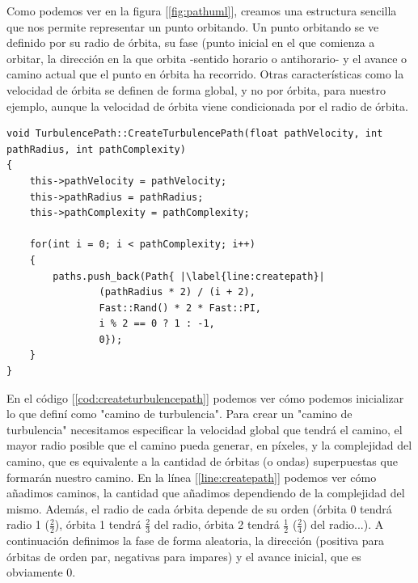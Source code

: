 Como podemos ver en la figura [\ref{fig:pathuml}], creamos una estructura sencilla que nos permite representar un punto orbitando. Un punto orbitando se ve definido por su radio de órbita, su fase (punto inicial en el que comienza a orbitar, la dirección en la que orbita -sentido horario o antihorario- y el avance o camino actual que el punto en órbita ha recorrido. Otras características como la velocidad de órbita se definen de forma global, y no por órbita, para nuestro ejemplo, aunque la velocidad de órbita viene condicionada por el radio de órbita.\\

\begin{lstlisting}[style=C-color, caption={Creación de un camino de turbulencia},label=cod:createturbulencepath,escapechar=|]
void TurbulencePath::CreateTurbulencePath(float pathVelocity, int pathRadius, int pathComplexity)
{
    this->pathVelocity = pathVelocity;
    this->pathRadius = pathRadius;
    this->pathComplexity = pathComplexity;

    for(int i = 0; i < pathComplexity; i++)
    {
        paths.push_back(Path{ |\label{line:createpath}|
                (pathRadius * 2) / (i + 2),
                Fast::Rand() * 2 * Fast::PI,
                i % 2 == 0 ? 1 : -1,
                0});
    }
}
\end{lstlisting}

En el código [\ref{cod:createturbulencepath}] podemos ver cómo podemos inicializar lo que definí como "camino de turbulencia". Para crear un "camino de turbulencia" necesitamos especificar la velocidad global que tendrá el camino, el mayor radio posible que el camino pueda generar, en píxeles, y la complejidad del camino, que es equivalente a la cantidad de órbitas (o ondas) superpuestas que formarán nuestro camino. En la línea [\ref{line:createpath}] podemos ver cómo añadimos caminos, la cantidad que añadimos dependiendo de la complejidad del mismo. Además, el radio de cada órbita depende de su orden (órbita 0 tendrá radio 1 (\(\frac{2}{2}\)), órbita 1 tendrá \(\frac{2}{3}\) del radio, órbita 2 tendrá \(\frac{1}{2}\) (\(\frac{2}{4}\)) del radio...). A continuación definimos la fase de forma aleatoria, la dirección (positiva para órbitas de orden par, negativas para impares) y el avance inicial, que es obviamente 0.\\

